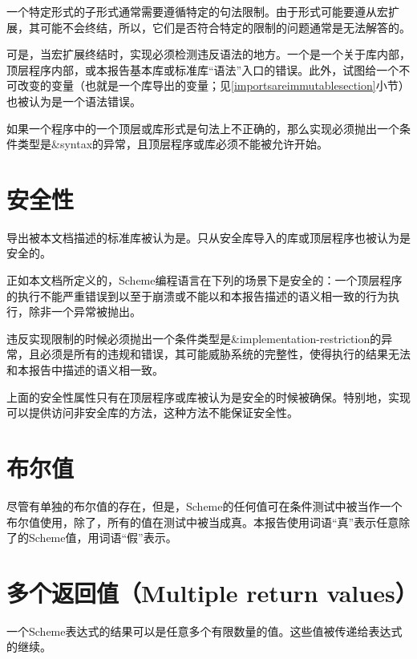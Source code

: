 一个特定形式的子形式通常需要遵循特定的句法限制。由于形式可能要遵从宏扩展，其可能不会终结，所以，它们是否符合特定的限制的问题通常是无法解答的。

可是，当宏扩展终结时，实现必须检测违反语法的地方。一个是一个关于库内部，顶层程序内部，或本报告基本库或标准库“语法”入口的错误。此外，试图给一个不可改变的变量（也就是一个库导出的变量；见\ref{importsareimmutablesection}小节）也被认为是一个语法错误。

如果一个程序中的一个顶层或库形式是句法上不正确的，那么实现必须抛出一个条件类型是{\cf\&syntax}的异常，且顶层程序或库必须不能被允许开始。

\section{安全性}
\label{safetysection}

导出被本文档描述的标准库被认为是。只从安全库导入的库或顶层程序也被认为是安全的。

正如本文档所定义的，Scheme编程语言在下列的场景下是安全的：一个顶层程序的执行不能严重错误到以至于崩溃或不能以和本报告描述的语义相一致的行为执行，除非一个异常被抛出。

违反实现限制的时候必须抛出一个条件类型是{\cf\&implementation-\hp{}restriction}的异常，且必须是所有的违规和错误，其可能威胁系统的完整性，使得执行的结果无法和本报告中描述的语义相一致。

上面的安全性属性只有在顶层程序或库被认为是安全的时候被确保。特别地，实现可以提供访问非安全库的方法，这种方法不能保证安全性。

\section{布尔值}
\label{booleanvaluessection}

 尽管有单独的布尔值的存在，但是，Scheme的任何值可在条件测试中被当作一个布尔值使用，除了\schfalse{}，所有的值在测试中被当成真。本报告使用词语“真”表示任意除了\schfalse{}的Scheme值，用词语“假”表示\schfalse{}。 

\section{多个返回值（Multiple return values）}
\label{multiplereturnvaluessection}

一个Scheme表达式的结果可以是任意多个有限数量的值。这些值被传递给表达式的继续。

